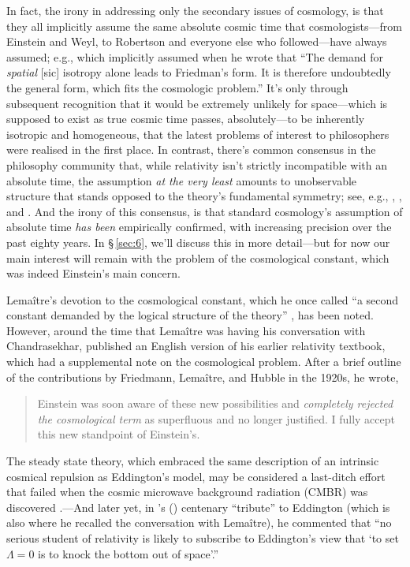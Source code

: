 \documentclass[12 pt]{article}
\def\citeapos#1{\citeauthor{#1}'s (\citeyear{#1})}
\begin{document}
In fact, the irony in addressing only the secondary issues of cosmology, is that they all implicitly assume the same absolute cosmic time that cosmologists---from Einstein and Weyl, to Robertson and everyone else who followed---have always assumed; e.g., which \citet{Einstein1945} implicitly assumed when he wrote that ``The demand for \textit{spatial} [sic] isotropy alone leads to Friedman's form. It is therefore undoubtedly the general form, which fits the cosmologic problem.'' It's only through subsequent recognition that it would be extremely unlikely for space---which is supposed to exist as true cosmic time passes, absolutely---to be inherently isotropic and homogeneous, that the latest problems of interest to philosophers were realised in the first place. In contrast, there's common consensus in the philosophy community that, while relativity isn't strictly incompatible with an absolute time, the assumption \textit{at the very least} amounts to unobservable structure that stands opposed to the theory's fundamental symmetry; see, e.g., \citet{Callender2000}, \citet[ch.~17]{Dainton2001}, and \citet{Maudlin2012}. And the irony of this consensus, is that standard cosmology's assumption of absolute time \textit{has been} empirically confirmed, with increasing precision over the past eighty years. In \S\,\ref{sec:6}, we'll discuss this in more detail---but for now our main interest will remain with the problem of the cosmological constant, which was indeed Einstein's main concern.

Lema\^{i}tre's devotion to the cosmological constant, which he once called ``a second constant demanded by the logical structure of the theory'' \citep{Lemaitre1949b}, has been noted. However, around the time that Lema\^{i}tre was having his conversation with Chandrasekhar, \citet{Pauli1958} published an English version of his earlier relativity textbook, which had a supplemental note on the cosmological problem. After a brief outline of the contributions by Friedmann, Lema\^{i}tre, and Hubble in the 1920s, he wrote, 
\begin{quote}
Einstein was soon aware of these new possibilities and \textit{completely rejected the cosmological term} as superfluous and no longer justified. I fully accept this new standpoint of Einstein's. 
\end{quote}
The steady state theory, which embraced the same description of an intrinsic cosmical repulsion as Eddington's model, may be considered a last-ditch effort that failed when the cosmic microwave background radiation (CMBR) was discovered \citep{Penzias1965,Dicke1965}.---And later yet, in \citeapos{Chandrasekhar1983} centenary ``tribute'' to Eddington (which is also where he recalled the conversation with Lema\^{i}tre), he commented that ``no serious student of relativity is likely to subscribe to Eddington's view that `to set $\Lambda=0$ is to knock the bottom out of space'.''
\end{document}
